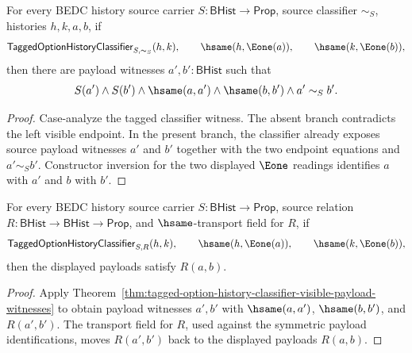 \begin{theorem}
\label{thm:tagged-option-history-classifier-visible-payload-witnesses}
For every BEDC history source carrier $S:\mathsf{BHist}\to\mathsf{Prop}$,
source classifier $\sim_S$, histories $h,k,a,b$, if
$$
\mathsf{TaggedOptionHistoryClassifier}_{S,\sim_S}(h,k),
\qquad
\hsame(h,\Eone(a)),
\qquad
\hsame(k,\Eone(b)),
$$
then there are payload witnesses $a',b':\mathsf{BHist}$ such that
$$
S(a')\land S(b')\land \hsame(a,a')\land\hsame(b,b')\land a'\sim_S b'.
$$
\end{theorem}
\begin{proof}
Case-analyze the tagged classifier witness. The absent branch contradicts the
left visible endpoint. In the present branch, the classifier already exposes
source payload witnesses $a'$ and $b'$ together with the two endpoint equations
and $a'\sim_S b'$. Constructor inversion for the two displayed $\Eone$ readings
identifies $a$ with $a'$ and $b$ with $b'$.
\end{proof}

\begin{theorem}
\label{thm:tagged-option-history-classifier-visible-payload-relation-transport}
For every BEDC history source carrier $S:\mathsf{BHist}\to\mathsf{Prop}$,
source relation $R:\mathsf{BHist}\to\mathsf{BHist}\to\mathsf{Prop}$, and
$\hsame$-transport field for $R$, if
$$
\mathsf{TaggedOptionHistoryClassifier}_{S,R}(h,k),
\qquad
\hsame(h,\Eone(a)),
\qquad
\hsame(k,\Eone(b)),
$$
then the displayed payloads satisfy $R(a,b)$.
\end{theorem}
\begin{proof}
Apply Theorem~\ref{thm:tagged-option-history-classifier-visible-payload-witnesses}
to obtain payload witnesses $a',b'$ with
$\hsame(a,a')$, $\hsame(b,b')$, and $R(a',b')$. The transport field for $R$,
used against the symmetric payload identifications, moves $R(a',b')$ back to
the displayed payloads $R(a,b)$.
\end{proof}

